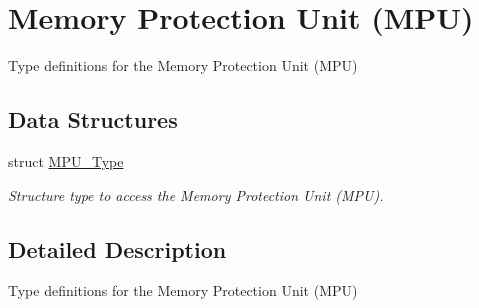 \hypertarget{group___c_m_s_i_s___m_p_u}{\section{Memory Protection Unit (M\-P\-U)}
\label{group___c_m_s_i_s___m_p_u}
}


Type definitions for the Memory Protection Unit (M\-P\-U)  


\subsection*{Data Structures}
\begin{DoxyCompactItemize}
\item 
struct \hyperlink{struct_m_p_u___type}{M\-P\-U\-\_\-\-Type}
\begin{DoxyCompactList}\small\item\em Structure type to access the Memory Protection Unit (M\-P\-U). \end{DoxyCompactList}\end{DoxyCompactItemize}


\subsection{Detailed Description}
Type definitions for the Memory Protection Unit (M\-P\-U) 